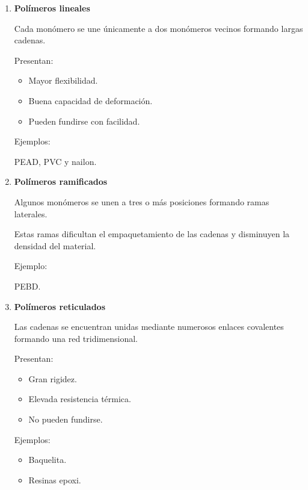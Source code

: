 \begin{enumerate}[label=\alph*)]

\item \textbf{Polímeros lineales}

Cada monómero se une únicamente a dos monómeros vecinos formando largas cadenas.

Presentan:

\begin{itemize}

\item Mayor flexibilidad.

\item Buena capacidad de deformación.

\item Pueden fundirse con facilidad.

\end{itemize}

Ejemplos:

PEAD, PVC y nailon.

\vspace{0.4cm}

\item \textbf{Polímeros ramificados}

Algunos monómeros se unen a tres o más posiciones formando ramas laterales.

Estas ramas dificultan el empaquetamiento de las cadenas y disminuyen la densidad del material.

Ejemplo:

PEBD.

\vspace{0.4cm}

\item \textbf{Polímeros reticulados}

Las cadenas se encuentran unidas mediante numerosos enlaces covalentes formando una red tridimensional.

Presentan:

\begin{itemize}

\item Gran rigidez.

\item Elevada resistencia térmica.

\item No pueden fundirse.

\end{itemize}

Ejemplos:

\begin{itemize}

\item Baquelita.

\item Resinas epoxi.

\end{itemize}

\end{enumerate}


